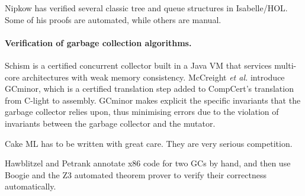 Nipkow \cite{nipkow2016, nipkow2017} has verified several classic 
tree and queue structures in Isabelle/HOL. Some of his proofs are automated, while 
others are manual. 

\paragraph{Verification of garbage collection algorithms.}
Schism \cite{gcexample4,gcexample4a} is a certified concurrent 
collector built in a Java VM that services multi-core architectures with weak memory consistency. 
McCreight \emph{et al.} \cite{gcexample5, gcexample3} introduce GCminor, which is 
a certified translation step added to CompCert's translation from C-light to assembly. 
GCminor makes explicit the specific invariants that the garbage collector 
relies upon, thus minimising errors due to the violation of invariants 
between the garbage collector and the mutator.

Cake ML\cite{cakemlgc} has to be written with great care. They are very serious competition.

Hawblitzel and Petrank \cite{gcexample2} annotate x86 code
for two GCs by hand, and then use Boogie and the Z3 automated theorem prover 
to verify their correctness automatically.



